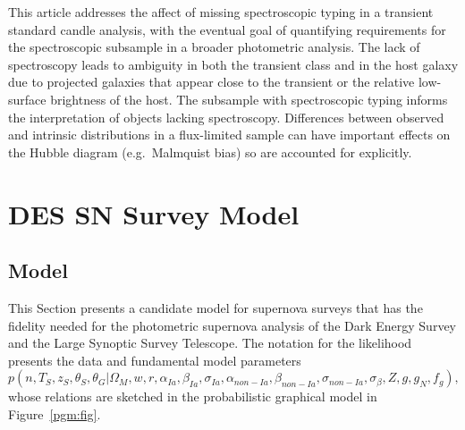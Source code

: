 \documentclass[preprint,3p]{elsarticle}
\begin{document}
This article addresses the affect of missing spectroscopic typing in
a transient standard candle analysis, with the eventual goal of quantifying
requirements for the spectroscopic subsample in a broader photometric analysis.
The lack of spectroscopy leads to ambiguity in both the transient class and
in the host galaxy due to projected galaxies that appear close to the transient or
the relative low-surface brightness of the host.  The subsample with
spectroscopic typing informs the interpretation of objects lacking spectroscopy.
Differences between observed and
intrinsic distributions in a flux-limited sample can have important effects on the Hubble
diagram  (e.g.\ Malmquist bias) so are accounted for explicitly.

\section{DES SN Survey Model}
\label{snIamodel:sec}
\subsection{Model}
This Section presents a candidate model
for supernova surveys that has the fidelity needed for the photometric
supernova analysis of the Dark Energy Survey and the Large Synoptic Survey Telescope.
The notation for the likelihood presents the data and fundamental model parameters
\begin{equation}
p(n, {{T}}_S,{{z}}_S, \theta_{S}, \theta_G |  \Omega_M, w, r, \alpha_{Ia}, \beta_{Ia},\sigma_{Ia}, \alpha_{\mathit{non-Ia}},\beta_{\mathit{non-Ia}}, \sigma_{\mathit{non-Ia}},  \sigma_\beta, Z, g, g_N, f_g),
\label{likelihood2:eqn}
\end{equation}
whose relations are sketched in the probabilistic graphical model in Figure~\ref{pgm:fig}.
\end{document}
